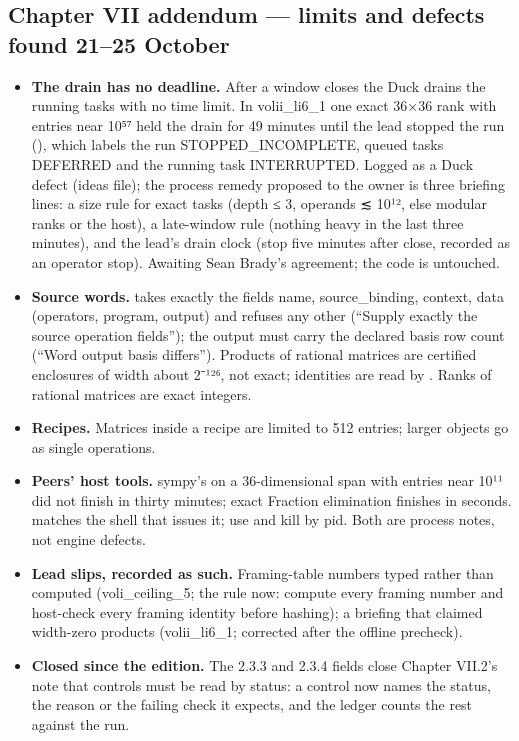 \subsection{Chapter VII addendum --- limits and defects found 21--25 October}\label{chapter-vii-addendum-limits-and-defects-found-2125-october}

\begin{itemize}
\tightlist
\item
  \textbf{The drain has no deadline.} After a window closes the Duck drains the running tasks with no time limit. In volii\_li6\_1 one exact 36×36 rank with entries near
  10⁵⁷ held the drain for 49 minutes until the lead stopped the run (), which labels the run STOPPED\_INCOMPLETE, queued tasks DEFERRED and the running
  task INTERRUPTED. Logged as a Duck defect (ideas file); the process remedy proposed to the owner is three briefing lines: a size rule for exact tasks (depth ≤ 3,
  operands ≲ 10¹², else modular ranks or the host), a late-window rule (nothing heavy in the last three minutes), and the lead's drain clock (stop five minutes after
  close, recorded as an operator stop). Awaiting Sean Brady's agreement; the code is untouched.
\item
  \textbf{Source words.}  takes exactly the fields name, source\_binding, context, data (operators, program, output) and refuses any other
  (``Supply exactly the source operation fields''); the output must carry the declared basis row count (``Word output basis differs''). Products of rational matrices are
  certified enclosures of width about 2⁻¹²⁶, not exact; identities are read by . Ranks of rational matrices are exact integers.
\item
  \textbf{Recipes.} Matrices inside a recipe are limited to 512 entries; larger objects go as single operations.
\item
  \textbf{Peers' host tools.} sympy's  on a 36-dimensional span with entries near 10¹¹ did not finish in thirty minutes; exact Fraction elimination finishes in
  seconds.  matches the shell that issues it; use  and kill by pid. Both are process notes, not engine defects.
\item
  \textbf{Lead slips, recorded as such.} Framing-table numbers typed rather than computed (voli\_ceiling\_5; the rule now: compute every framing number and host-check every
  framing identity before hashing); a briefing that claimed width-zero products (volii\_li6\_1; corrected after the offline precheck).
\item
  \textbf{Closed since the edition.} The 2.3.3 and 2.3.4 fields close Chapter VII.2's note that controls must be read by status: a control now names the status, the reason
  or the failing check it expects, and the ledger counts the rest against the run.
\end{itemize}

